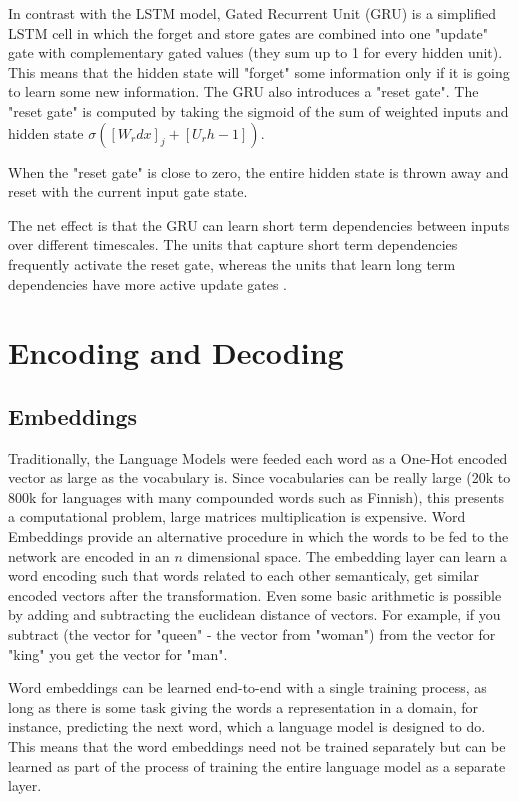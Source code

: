 \documentclass[a4paper]{article}
\begin{document}
In contrast with the LSTM model, Gated Recurrent Unit (GRU) \cite{cho2014} is a simplified
LSTM cell in which the forget and store gates are combined into one "update" gate with complementary
gated values (they sum up to 1 for every hidden unit). This means that the hidden state will
"forget" some information only if it is going to learn some new information. The GRU also
introduces a "reset gate". The "reset gate" is computed by taking the sigmoid of the sum of weighted
inputs and hidden state
 $\sigma ([ W_r d x]_j + [ U_r  h - 1])$.

When the "reset gate" is close to zero, the entire hidden state is thrown away and reset with
the current input gate state.

The net effect is that the GRU can learn short term dependencies between inputs
over different timescales. The units that capture short term dependencies frequently
activate the reset gate, whereas the units that learn long term dependencies have
more active update gates \cite{cho2014}.

\section{Encoding and Decoding}
\label{sec:encdec}

\subsection{Embeddings}
\label{sec:embedddings}

Traditionally, the Language Models were feeded each word as a One-Hot encoded vector as large as the
vocabulary is. Since vocabularies can be really large (20k to 800k for languages
with many compounded words such as Finnish), this presents a computational
problem, large matrices multiplication is expensive. Word Embeddings provide an
alternative procedure in which the words to be fed to the network are encoded
in an $n$ dimensional space. The embedding layer can learn a word encoding such
that words related to each other semanticaly, get similar encoded vectors after
the transformation. Even some basic arithmetic is possible by adding and subtracting the euclidean distance of vectors. For example, if you
subtract (the vector for "queen" - the vector from "woman") from the vector for "king" you get the vector
for "man".

Word embeddings can be learned end-to-end with a single training
process, as long as there is some task giving the words a representation in a domain,
for instance, predicting the next word, which a language model is designed to do. This
means that the word embeddings need not be trained separately but can be learned
as part of the process of training the entire language model as a separate layer.
\end{document}
